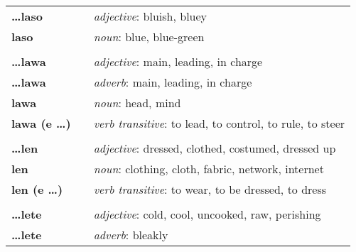 \begin{supertabular}{p{2,5cm}|ll}
    \textbf{\dots laso}          &  & \textit{adjective}: bluish, bluey                                                                          \\
    \textbf{laso}                &  & \textit{noun}: blue, blue-green                                                                            \\
                                 &  &                                                                                                            \\ %
    \textbf{\dots lawa}          &  & \textit{adjective}: main, leading, in charge                                                               \\
    \textbf{\dots lawa}          &  & \textit{adverb}: main, leading, in charge                                                                  \\
    \textbf{lawa}                &  & \textit{noun}: head, mind                                                                                  \\
    \textbf{lawa (e \dots)}      &  & \textit{verb transitive}: to lead, to control, to rule, to steer                                           \\
                                 &  &                                                                                                            \\ %
    \textbf{\dots len}           &  & \textit{adjective}: dressed, clothed, costumed, dressed up                                                 \\
    \textbf{len}                 &  & \textit{noun}: clothing, cloth, fabric, network, internet                                                  \\
    \textbf{len (e \dots)}       &  & \textit{verb transitive}: to wear, to be dressed, to dress                                                 \\
                                 &  &                                                                                                            \\ %
    \textbf{\dots lete}          &  & \textit{adjective}: cold, cool, uncooked, raw, perishing                                                   \\
    \textbf{\dots lete}          &  & \textit{adverb}: bleakly                                                                                   \\

\end{supertabular}
